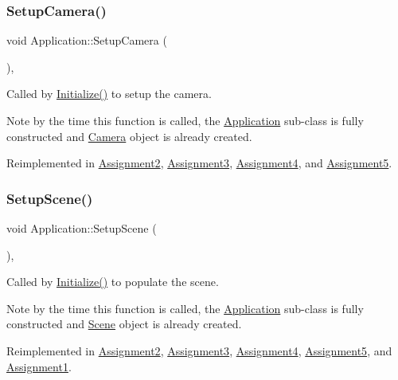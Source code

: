 \subsubsection{\texorpdfstring{Setup\+Camera()}{SetupCamera()}}
{\footnotesize\ttfamily void Application\+::\+Setup\+Camera (\begin{DoxyParamCaption}{ }\end{DoxyParamCaption})\hspace{0.3cm}{\ttfamily [private]}, {\ttfamily [virtual]}}



Called by \hyperlink{class_application_a17cf1ea4552d26a1c20f7d98d793d41d}{Initialize()} to setup the camera.

Note by the time this function is called, the \hyperlink{class_application}{Application} sub-\/class is fully constructed and \hyperlink{class_camera}{Camera} object is already created.

Reimplemented in \hyperlink{class_assignment2_ab9ace1ffdac8f7425c64d661f3d13acd}{Assignment2}, \hyperlink{class_assignment3_a1d23eb19973b78e516169f4a03954526}{Assignment3}, \hyperlink{class_assignment4_aa2bc15adb48cf54e477fce0c686cf2f0}{Assignment4}, and \hyperlink{class_assignment5_a0c49123e133adfb36c769c943eae42fa}{Assignment5}.

\hypertarget{class_application_aa8e8017ef8dd86293c96d0645e66d440}{}\label{class_application_aa8e8017ef8dd86293c96d0645e66d440}
\subsubsection{\texorpdfstring{Setup\+Scene()}{SetupScene()}}
{\footnotesize\ttfamily void Application\+::\+Setup\+Scene (\begin{DoxyParamCaption}{ }\end{DoxyParamCaption})\hspace{0.3cm}{\ttfamily [private]}, {\ttfamily [virtual]}}



Called by \hyperlink{class_application_a17cf1ea4552d26a1c20f7d98d793d41d}{Initialize()} to populate the scene.

Note by the time this function is called, the \hyperlink{class_application}{Application} sub-\/class is fully constructed and \hyperlink{class_scene}{Scene} object is already created.

Reimplemented in \hyperlink{class_assignment2_aa4f8ccd09a7accbdf093394c6ee4f63f}{Assignment2}, \hyperlink{class_assignment3_a2dc29d9016a9d822ede84b9ef41429a5}{Assignment3}, \hyperlink{class_assignment4_a38c50647bb65ff03aaf293fcc21dc5fd}{Assignment4}, \hyperlink{class_assignment5_a43328e09e6241ae6c62a9b7be7659b3b}{Assignment5}, and \hyperlink{class_assignment1_a8d12cf21f1463caa5a8da45110b50103}{Assignment1}.

